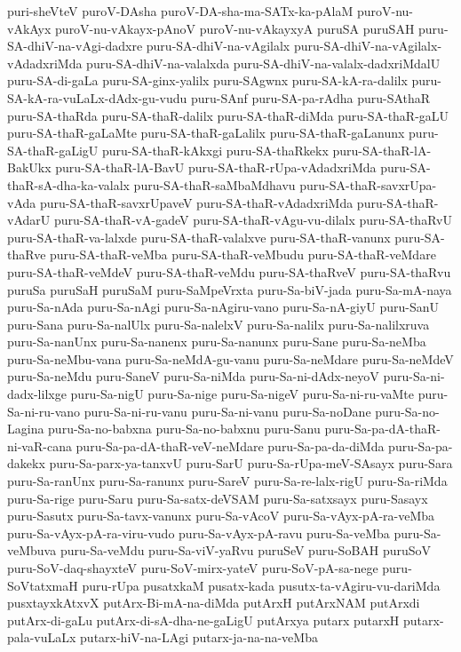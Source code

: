 {puri-sheVteV
puroV-DAsha
puroV-DA-sha-ma-SATx-ka-pAlaM
puroV-nu-vAkAyx
puroV-nu-vAkayx-pAnoV
puroV-nu-vAkayxyA
puruSA
puruSAH
puru-SA-dhiV-na-vAgi-dadxre
puru-SA-dhiV-na-vAgilalx
puru-SA-dhiV-na-vAgilalx-vAdadxriMda
puru-SA-dhiV-na-valalxda
puru-SA-dhiV-na-valalx-dadxriMdalU
puru-SA-di-gaLa
puru-SA-ginx-yalilx
puru-SAgwnx
puru-SA-kA-ra-dalilx
puru-SA-kA-ra-vuLaLx-dAdx-gu-vudu
puru-SAnf
puru-SA-pa-rAdha
puru-SAthaR
puru-SA-thaRda
puru-SA-thaR-dalilx
puru-SA-thaR-diMda
puru-SA-thaR-gaLU
puru-SA-thaR-gaLaMte
puru-SA-thaR-gaLalilx
puru-SA-thaR-gaLanunx
puru-SA-thaR-gaLigU
puru-SA-thaR-kAkxgi
puru-SA-thaRkekx
puru-SA-thaR-lA-BakUkx
puru-SA-thaR-lA-BavU
puru-SA-thaR-rUpa-vAdadxriMda
puru-SA-thaR-sA-dha-ka-valalx
puru-SA-thaR-saMbaMdhavu
puru-SA-thaR-savxrUpa-vAda
puru-SA-thaR-savxrUpaveV
puru-SA-thaR-vAdadxriMda
puru-SA-thaR-vAdarU
puru-SA-thaR-vA-gadeV
puru-SA-thaR-vAgu-vu-dilalx
puru-SA-thaRvU
puru-SA-thaR-va-lalxde
puru-SA-thaR-valalxve
puru-SA-thaR-vanunx
puru-SA-thaRve
puru-SA-thaR-veMba
puru-SA-thaR-veMbudu
puru-SA-thaR-veMdare
puru-SA-thaR-veMdeV
puru-SA-thaR-veMdu
puru-SA-thaRveV
puru-SA-thaRvu
puruSa
puruSaH
puruSaM
puru-SaMpeVrxta
puru-Sa-biV-jada
puru-Sa-mA-naya
puru-Sa-nAda
puru-Sa-nAgi
puru-Sa-nAgiru-vano
puru-Sa-nA-giyU
puru-SanU
puru-Sana
puru-Sa-nalUlx
puru-Sa-nalelxV
puru-Sa-nalilx
puru-Sa-nalilxruva
puru-Sa-nanUnx
puru-Sa-nanenx
puru-Sa-nanunx
puru-Sane
puru-Sa-neMba
puru-Sa-neMbu-vana
puru-Sa-neMdA-gu-vanu
puru-Sa-neMdare
puru-Sa-neMdeV
puru-Sa-neMdu
puru-SaneV
puru-Sa-niMda
puru-Sa-ni-dAdx-neyoV
puru-Sa-ni-dadx-lilxge
puru-Sa-nigU
puru-Sa-nige
puru-Sa-nigeV
puru-Sa-ni-ru-vaMte
puru-Sa-ni-ru-vano
puru-Sa-ni-ru-vanu
puru-Sa-ni-vanu
puru-Sa-noDane
puru-Sa-no-Lagina
puru-Sa-no-babxna
puru-Sa-no-babxnu
puru-Sanu
puru-Sa-pa-dA-thaR-ni-vaR-cana
puru-Sa-pa-dA-thaR-veV-neMdare
puru-Sa-pa-da-diMda
puru-Sa-pa-dakekx
puru-Sa-parx-ya-tanxvU
puru-SarU
puru-Sa-rUpa-meV-SAsayx
puru-Sara
puru-Sa-ranUnx
puru-Sa-ranunx
puru-SareV
puru-Sa-re-lalx-rigU
puru-Sa-riMda
puru-Sa-rige
puru-Saru
puru-Sa-satx-deVSAM
puru-Sa-satxsayx
puru-Sasayx
puru-Sasutx
puru-Sa-tavx-vanunx
puru-Sa-vAcoV
puru-Sa-vAyx-pA-ra-veMba
puru-Sa-vAyx-pA-ra-viru-vudo
puru-Sa-vAyx-pA-ravu
puru-Sa-veMba
puru-Sa-veMbuva
puru-Sa-veMdu
puru-Sa-viV-yaRvu
puruSeV
puru-SoBAH
puruSoV
puru-SoV-daq-shayxteV
puru-SoV-mirx-yateV
puru-SoV-pA-sa-nege
puru-SoVtatxmaH
puru-rUpa
pusatxkaM
pusatx-kada
pusutx-ta-vAgiru-vu-dariMda
pusxtayxkAtxvX
putArx-Bi-mA-na-diMda
putArxH
putArxNAM
putArxdi
putArx-di-gaLu
putArx-di-sA-dha-ne-gaLigU
putArxya
putarx
putarxH
putarx-pala-vuLaLx
putarx-hiV-na-LAgi
putarx-ja-na-na-veMba
}
